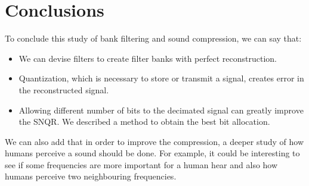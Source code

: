 \documentclass[a4paper,twocolumn]{article}
\begin{document}
\section{Conclusions}
\label{sec:conclusions}

To conclude this study of bank filtering and sound compression, we can say that:
\begin{itemize}
\item We can devise filters to create filter banks with perfect reconstruction.
\item Quantization, which is necessary to store or transmit a signal, creates error in the reconstructed signal.
\item Allowing different number of bits to the decimated signal can greatly improve the SNQR. We described a method to obtain the best bit allocation.
\end{itemize}

We can also add that in order to improve the compression, a deeper study of how humans perceive a sound should be done. For example, it could be interesting to see if some frequencies are more important for a human hear and also how humans perceive two neighbouring frequencies.
\end{document}
